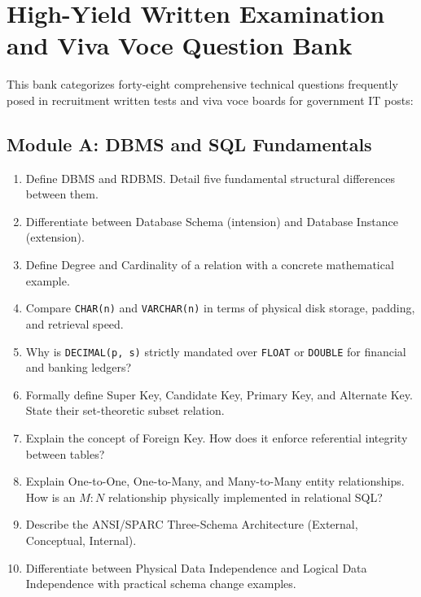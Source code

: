 \section{High-Yield Written Examination and Viva Voce Question Bank}
\label{sec:dbms_viva_questions}

This bank categorizes forty-eight comprehensive technical questions frequently posed in recruitment written tests and viva voce boards for government IT posts:

\subsection{Module A: DBMS and SQL Fundamentals}
\begin{enumerate}
    \item Define DBMS and RDBMS. Detail five fundamental structural differences between them.
    \item Differentiate between Database Schema (intension) and Database Instance (extension).
    \item Define Degree and Cardinality of a relation with a concrete mathematical example.
    \item Compare \texttt{CHAR(n)} and \texttt{VARCHAR(n)} in terms of physical disk storage, padding, and retrieval speed.
    \item Why is \texttt{DECIMAL(p, s)} strictly mandated over \texttt{FLOAT} or \texttt{DOUBLE} for financial and banking ledgers?
    \item Formally define Super Key, Candidate Key, Primary Key, and Alternate Key. State their set-theoretic subset relation.
    \item Explain the concept of Foreign Key. How does it enforce referential integrity between tables?
    \item Explain One-to-One, One-to-Many, and Many-to-Many entity relationships. How is an $M:N$ relationship physically implemented in relational SQL?
    \item Describe the ANSI/SPARC Three-Schema Architecture (External, Conceptual, Internal).
    \item Differentiate between Physical Data Independence and Logical Data Independence with practical schema change examples.
\end{enumerate}

